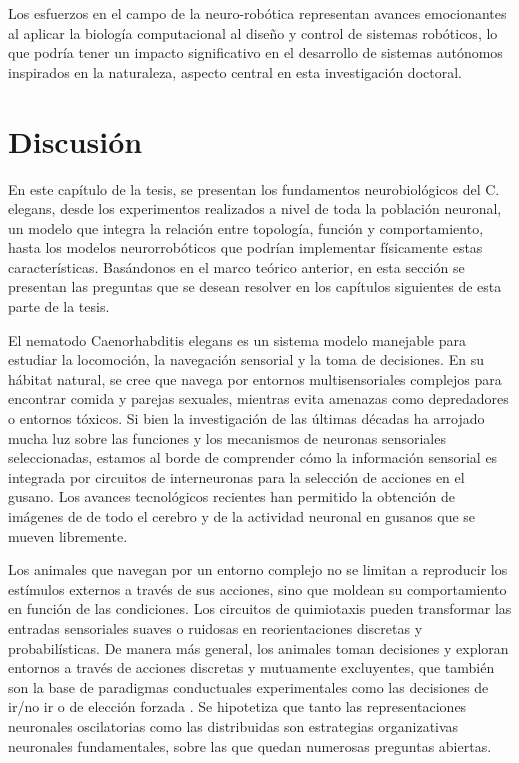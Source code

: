 Los esfuerzos en el campo de la neuro-robótica representan avances emocionantes al aplicar la biología computacional al diseño y control de sistemas robóticos, lo que podría tener un impacto significativo en el desarrollo de sistemas autónomos inspirados en la naturaleza, aspecto central en esta investigación doctoral.




\section{Discusión}



En este capítulo de la tesis, se presentan los fundamentos neurobiológicos del C. elegans, desde los experimentos realizados a nivel de toda la población neuronal, un modelo que integra la relación entre topología, función y comportamiento, hasta los modelos neurorrobóticos que podrían implementar físicamente estas características. Basándonos en el marco teórico anterior, en esta sección se presentan las preguntas que se desean resolver en los capítulos siguientes de esta parte de la tesis.

El nematodo Caenorhabditis elegans es un sistema modelo manejable para estudiar la locomoción, la navegación sensorial y la toma de decisiones. En su hábitat natural, se cree que navega por entornos multisensoriales complejos para encontrar comida y parejas sexuales, mientras evita amenazas como depredadores o entornos tóxicos. Si bien la investigación de las últimas décadas ha arrojado mucha luz sobre las funciones y los mecanismos de neuronas sensoriales seleccionadas, estamos al borde de comprender cómo la información sensorial es integrada por circuitos de interneuronas para la selección de acciones en el gusano. Los avances tecnológicos recientes han permitido la obtención de imágenes de  de todo el cerebro y de la actividad neuronal en gusanos que se mueven libremente.


Los animales que navegan por un entorno complejo no se limitan a reproducir los estímulos externos a través de sus acciones, sino que moldean su comportamiento en función de las condiciones. Los circuitos de quimiotaxis pueden transformar las entradas sensoriales suaves o ruidosas en reorientaciones discretas y probabilísticas. De manera más general, los animales toman decisiones y exploran entornos a través de acciones discretas y mutuamente excluyentes, que también son la base de paradigmas conductuales experimentales como las decisiones de ir/no ir o de elección forzada \cite{frederick_characterizing_2011}. Se hipotetiza que tanto las representaciones neuronales oscilatorias como las distribuidas son estrategias organizativas neuronales fundamentales, sobre las que quedan numerosas preguntas abiertas.

